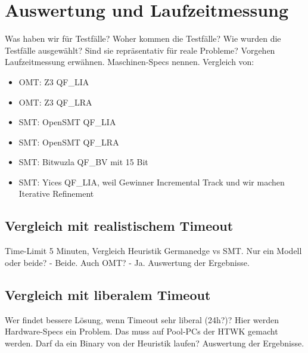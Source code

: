 \chapter{Auswertung und Laufzeitmessung}
\label{chapter:auswertung}

Was haben wir für Testfälle?
Woher kommen die Testfälle?
Wie wurden die Testfälle ausgewählt?
Sind sie repräsentativ für reale Probleme?
Vorgehen Laufzeitmessung erwähnen.
Maschinen-Specs nennen.
Vergleich von:
\begin{itemize}
    \item OMT: Z3 QF\_LIA
    \item OMT: Z3 QF\_LRA
    \item SMT: OpenSMT QF\_LIA
    \item SMT: OpenSMT QF\_LRA
    \item SMT: Bitwuzla QF\_BV mit 15 Bit
    \item SMT: Yices QF\_LIA, weil Gewinner Incremental Track und wir machen Iterative Refinement
\end{itemize}

\section{Vergleich mit realistischem Timeout}
Time-Limit 5 Minuten, Vergleich Heuristik Germanedge vs SMT.
Nur ein Modell oder beide? - Beide.
Auch OMT? - Ja.
Auswertung der Ergebnisse.

\section{Vergleich mit liberalem Timeout}
Wer findet bessere Lösung, wenn Timeout sehr liberal (24h?)?
Hier werden Hardware-Specs ein Problem.
Das muss auf Pool-PCs der HTWK gemacht werden.
Darf da ein Binary von der Heuristik laufen?
Auswertung der Ergebnisse.
